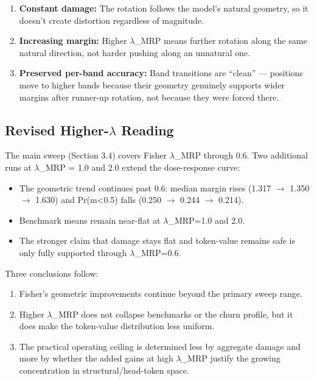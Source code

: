\documentclass[
  11pt,
]{article}
\providecommand{\tightlist}{%
  \setlength{\itemsep}{0pt}\setlength{\parskip}{0pt}}
\begin{document}
\begin{enumerate}
\def\labelenumi{\arabic{enumi}.}
\tightlist
\item
  \textbf{Constant damage:} The rotation follows the model's natural
  geometry, so it doesn't create distortion regardless of magnitude.
\item
  \textbf{Increasing margin:} Higher $\lambda$\_MRP means further rotation along
  the same natural direction, not harder pushing along an unnatural one.
\item
  \textbf{Preserved per-band accuracy:} Band transitions are ``clean''
  --- positions move to higher bands because their geometry genuinely
  supports wider margins after runner-up rotation, not because they were
  forced there.
\end{enumerate}

\hypertarget{revised-higher-ux3bb-reading}{%
\subsection{Revised Higher-$\lambda$
Reading}\label{revised-higher-ux3bb-reading}}

The main sweep (Section 3.4) covers Fisher $\lambda$\_MRP through 0.6. Two
additional runs at $\lambda$\_MRP = 1.0 and 2.0 extend the dose-response curve:

\begin{itemize}
\tightlist
\item
  The geometric trend continues past 0.6: median margin rises (1.317 $\rightarrow$
  1.350 $\rightarrow$ 1.630) and Pr(m\textless0.5) falls (0.250 $\rightarrow$ 0.244 $\rightarrow$ 0.214).
\item
  Benchmark means remain near-flat at $\lambda$\_MRP=1.0 and 2.0.
\item
  The stronger claim that damage stays flat and token-value remains safe
  is only fully supported through $\lambda$\_MRP=0.6.
\end{itemize}

Three conclusions follow:

\begin{enumerate}
\def\labelenumi{\arabic{enumi}.}
\tightlist
\item
  Fisher's geometric improvements continue beyond the primary sweep
  range.
\item
  Higher $\lambda$\_MRP does not collapse benchmarks or the churn profile, but
  it does make the token-value distribution less uniform.
\item
  The practical operating ceiling is determined less by aggregate damage
  and more by whether the added gains at high $\lambda$\_MRP justify the growing
  concentration in structural/head-token space.
\end{enumerate}
\end{document}
